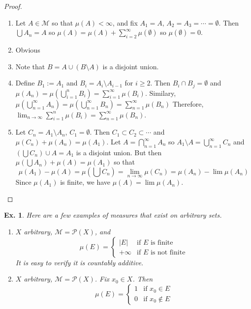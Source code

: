 \documentclass[12pt, a4paper]{book}
\newtheorem{example}[theorem]{Ex.}
\theoremstyle{nonumberplain}
\newtheorem{proof}{Proof}
\begin{document}
\begin{proof}
    \begin{enumerate}
        \item Let $A\in\mathcal{M}$ so that $\mu(A)<\infty$, and fix $A_1=A$, $A_2=A_3=\cdots=\emptyset$.
            Then $\bigcup A_n=A$ so $\mu(A)=\mu(A)+\sum\limits_{i=2}^\infty \mu(\emptyset)$ so $\mu(\emptyset)=0$.
        \item Obvious
        \item Note that $B=A\cup(B\setminus A)$ is a disjoint union.
        \item Define $B_1:=A_1$ and $B_i=A_i\setminus A_{i-1}$ for $i\geq 2$.
            Then $B_i\cap B_j=\emptyset$ and $\mu(A_n)=\mu\left(\bigcup\limits_{i=1}^n B_i\right)=\sum\limits_{i=1}^\infty\mu(B_i)$.
            Similary, $\mu\left(\bigcup\limits_{n=1}^\infty A_n\right)=\mu\left(\bigcup\limits_{n=1}^\infty B_n\right)=\sum\limits_{n=1}^\infty\mu(B_n)$
            Therefore, $\lim_{n\to\infty}\sum\limits_{i=1}^n \mu(B_i)=\sum\limits_{n=1}^\infty \mu(B_n)$.
        \item Let $C_n=A_1\setminus A_n$, $C_1=\emptyset$.
            Then $C_1\subset C_2\subset\cdots$ and $\mu(C_n)+\mu(A_n)=\mu(A_1)$.
            Let $A=\bigcap\limits_{n=1}^\infty A_n$ so $A_1\setminus A=\bigcup\limits_{n=1}^\infty C_n$ and $(\bigcup C_n)\cup A=A_1$ is a disjoint union.
            But then $\mu(\bigcup A_n)+\mu(A)=\mu(A_1)$ so that
            \[\mu(A_1)-\mu(A)=\mu(\bigcup C_n)=\lim_{n\to\infty}\mu(C_n)=\mu(A_n)-\lim \mu(A_n)\]
            Since $\mu(A_1)$ is finite, we have $\mu(A)=\lim\mu(A_n)$.
    \end{enumerate}
\end{proof}
\begin{example}
    Here are a few examples of measures that exist on arbitrary sets.
    \begin{enumerate}
        \item $X$ arbitrary, $\mathcal{M}=\mathcal{P}(X)$, and
            \[\mu(E)=\begin{cases}|E|&\text{if $E$ is finite}\\+\infty&\text{if $E$ is not finite}\end{cases}\]
            It is easy to verify it is countably additive.
        \item $X$ arbitrary, $\mathcal{M}=\mathcal{P}(X)$.
            Fix $x_0\in X$.
            Then
            \[\mu(E)=\begin{cases}1&\text{if $x_0\in E$}\\0&\text{if $x_0\notin E$}\end{cases}\]
    \end{enumerate}
\end{example}
\end{document}
